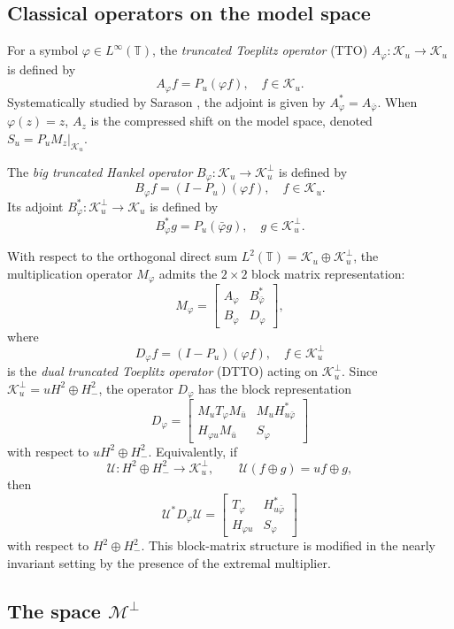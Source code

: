 \documentclass[12pt]{amsart}
\theoremstyle{definition}
\theoremstyle{remark}
\def \T{\mathbb{T}}
\newcommand{\clm}{\mathcal{M}}
\newcommand{\clk}{\mathcal{K}}
\newcommand{\vp}{\varphi}
\newcommand\restr[2]{\ensuremath{\left.#1\right|_{#2}}}
\numberwithin{equation}{section}
\begin{document}
\subsection{Classical operators on the model space}

For a symbol $\vp \in L^\infty(\T)$, the \emph{truncated Toeplitz operator} (TTO) $A_\vp : \clk_u \to \clk_u$ is defined by 
\[ A_\vp f = P_u (\vp f), \quad f \in \clk_u. \]
Systematically studied by Sarason \cite{Sarason2007}, the adjoint is given by $A_\vp^* = A_{\bar{\vp}}$. When $\vp(z) = z$, $A_z$ is the compressed shift on the model space, denoted $S_u = \restr{P_u M_z}{\clk_u}$.

The \emph{big truncated Hankel operator} $B_\vp : \clk_u \to \clk_u^\perp$ is defined by
\[ B_\vp f = (I-P_u) (\vp f), \quad f \in \clk_u. \]
Its adjoint $B_\vp^* : \clk_u^\perp \to \clk_u$ is defined by
\[ B_\vp^* g = P_u (\bar{\vp} g), \quad g \in \clk_u^\perp. \]

With respect to the orthogonal direct sum $L^2(\T) = \clk_u \oplus \clk_u^\perp$, the multiplication operator $M_\vp$ admits the $2 \times 2$ block matrix representation:
\[ M_\vp = \begin{bmatrix} A_\vp & B_{\bar{\vp}}^* \\ B_\vp & D_\vp \end{bmatrix}, \]
where \[D_\vp f = (I-P_{u})(\vp f),\quad f\in \clk_u^\perp\] is the \emph{dual truncated Toeplitz operator} (DTTO) acting on $\clk_u^\perp$. Since $\clk_u^\perp=uH^2\oplus H_{-}^2$, the operator $D_\vp$ has the block representation
\[
D_\vp
=
\begin{bmatrix}
M_uT_\vp M_{\bar u} & M_uH_{u\bar\vp}^{*}\\
H_{\vp u}M_{\bar u} & S_\vp
\end{bmatrix}
\]
with respect to $uH^2\oplus H_{-}^2$. Equivalently, if
\[
\mathcal{U}:H^2\oplus H_{-}^2\to\clk_u^\perp,
\qquad \mathcal{U}(f\oplus g)=uf\oplus g,
\]
then
\[
\mathcal{U}^*D_\vp\mathcal{U}
=\begin{bmatrix}
T_\vp & H_{u\bar\vp}^{*}\\
H_{\vp u} & S_\vp
\end{bmatrix}
\]
with respect to $H^2\oplus H_{-}^2$. This block-matrix structure is modified in the nearly invariant setting by the presence of the extremal multiplier.

\subsection{The space $\clm^\perp$}
\end{document}
